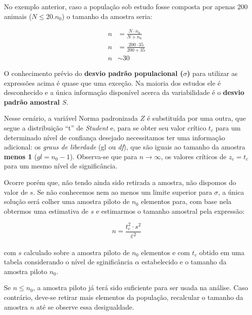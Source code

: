 \documentclass[
]{book}
\begin{document}
No exemplo anterior, caso a população sob estudo fosse composta por apenas 200 animais (\(N \le 20.n_{0}\)) o tamanho da amostra seria:

\hfill\break

\begin{align*}
n & = \frac{N \cdot n_{0}}{N + n_{0}} \\
n & = \frac{200 \cdot 35}{200  + 35 } \\
n & \sim 30
\end{align*}

\hfill\break

O conhecimento prévio do \textbf{desvio padrão populacional (\(\sigma\))} para utilizar as expressões acima é quase que uma exceção. Na maioria dos estudos ele é desconhecido e a única informação disponível acerca da variabilidade é o \textbf{desvio padrão amostral \(S\)}.

\hfill\break

Nesse cenário, a variável Norma padronizada \(Z\) é substituída por uma outra, que segue a distribuição ``t'' de \emph{Student} e, para se obter seu valor crítico \(t_{c}\) para um determinado nível de confiança desejado necessitamos ter uma informação adicional: os \emph{graus de liberdade} (gl ou \emph{df}), que são iguais ao tamanho da amostra \textbf{menos 1} (\(gl=n_{0}-1\)). Observa-se que para \(n \to \infty\), os valores críticos de \(z_{c}=t_{c}\) para um mesmo nível de significância.

\hfill\break

Ocorre porém que, não tendo ainda sido retirada a amostra, não dispomos do valor de \(s\). Se não conhecemos nem ao menos um limite superior para \(\sigma\), a única solução será colher uma amostra piloto de \(n_0\) elementos para, com base nela obtermos uma estimativa de \(s\) e estimarmos o tamanho amostral pela expressão:

\[
n =  \frac{t_{c}^2 \cdot s^2}{\varepsilon^2}
\]\\

com \(s\) calculado sobre a amostra piloto de \(n_{0}\) elementos e com \(t_{c}\) obtido em uma tabela considerando o nível de sginificância \(\alpha\) estabelecido e o tamanho da amostra piloto \(n_{0}\).

\hfill\break

Se \(n \le n_{0}\), a amostra piloto já terá sido suficiente para ser usada na análise. Caso contrário, deve-se retirar mais elementos da população, recalcular o tamanho da amostra \(n\) até se observe essa desigualdade.
\end{document}
